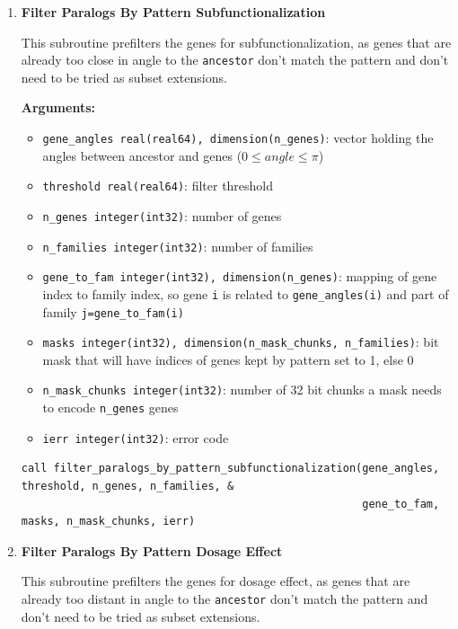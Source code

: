 \begin{enumerate}
    \item \textbf{Filter Paralogs By Pattern Subfunctionalization}

        This subroutine prefilters the genes for subfunctionalization,  
        as genes that are already too close in angle to the \lstinline!ancestor! don't match the pattern and don't need to be tried as subset extensions.

        \textbf{Arguments:}
        \begin{itemize}
            \item \lstinline!gene_angles real(real64), dimension(n_genes)!: vector holding the angles between ancestor and genes (\(0 \le angle \le \pi\))
            \item \lstinline!threshold real(real64)!: filter threshold
            \item \lstinline!n_genes integer(int32)!: number of genes
            \item \lstinline!n_families integer(int32)!: number of families
            \item \lstinline!gene_to_fam integer(int32), dimension(n_genes)!: mapping of gene index to family index, so gene \lstinline!i! is related to \lstinline!gene_angles(i)! and part of family \lstinline!j=gene_to_fam(i)!
            \item \lstinline!masks integer(int32), dimension(n_mask_chunks, n_families)!: bit mask that will have indices of genes kept by pattern set to 1, else 0
            \item \lstinline!n_mask_chunks integer(int32)!: number of 32 bit chunks a mask needs to encode \lstinline!n_genes! genes
            \item \lstinline!ierr integer(int32)!: error code
        \end{itemize}

\begin{lstlisting}[caption={Prefiltering Paralogs for Subfunctionalization}]
call filter_paralogs_by_pattern_subfunctionalization(gene_angles, threshold, n_genes, n_families, &
                                                     gene_to_fam, masks, n_mask_chunks, ierr)
\end{lstlisting}


    \item \textbf{Filter Paralogs By Pattern Dosage Effect}

        This subroutine prefilters the genes for dosage effect,  
        as genes that are already too distant in angle to the \lstinline!ancestor! don't match the pattern and don't need to be tried as subset extensions.


\end{enumerate}
